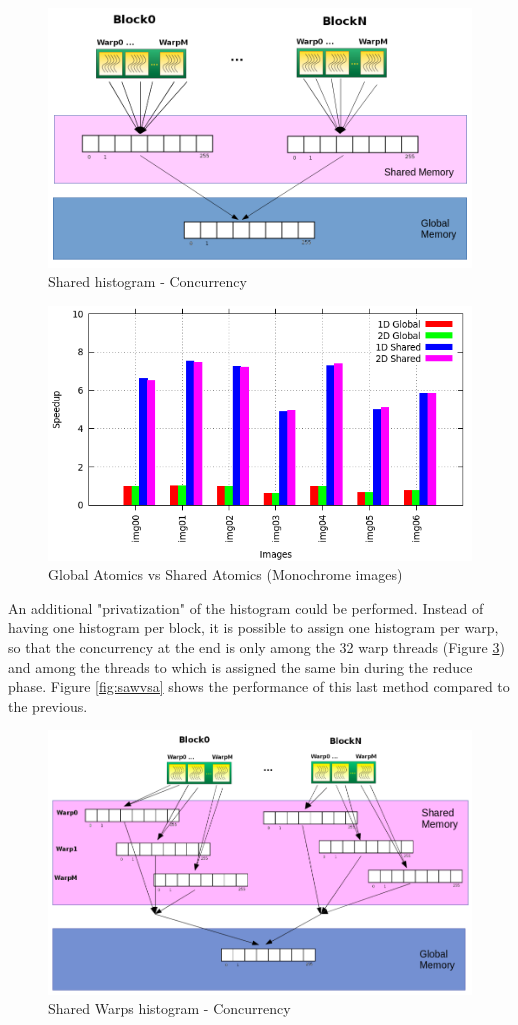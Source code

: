 \documentclass[a4paper]{article}
\begin{document}
\begin{figure}[!ht]
    \centering
    \includegraphics[width=0.7\linewidth]{shared_histo}
    \caption{Shared histogram - Concurrency}
    \label{fig:shsh}
\end{figure}
\FloatBarrier

\begin{figure}[!ht]
    \centering
    \includegraphics[width=0.7\linewidth]{res/new/histogram_confronto}
    \caption{Global Atomics vs Shared Atomics (Monochrome images)}
    \label{fig:gavsa}
\end{figure}
\FloatBarrier

An additional "privatization" of the histogram could be performed. Instead of having one histogram per block, it is possible to assign one histogram per warp, so that the concurrency at the end is only among the 32 warp threads (Figure \ref{fig:whwh}) and among the threads to which is assigned the same bin during the reduce phase. Figure \ref{fig:sawvsa} shows the performance of this last method compared to the previous. 

\begin{figure}[!ht]
    \centering
    \includegraphics[width=0.9\linewidth]{histo_warp}
    \caption{Shared Warps histogram - Concurrency}
    \label{fig:whwh}
\end{figure}
\FloatBarrier
\end{document}
